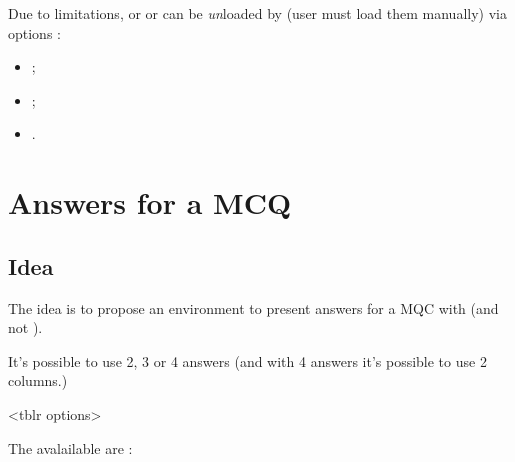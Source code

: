 \documentclass[english,11pt,a4paper]{article}
\begin{document}
Due to limitations,  or  or  can be \textit{un}loaded by  (user must load them manually) via options :

\begin{itemize}
	\item {} ;
	\item {} ;
	\item {}.
\end{itemize}

\begin{codehigh}[language=latex/latex3,style/main=teal!25,style/code=teal!25]
\usepackage{customenvs}

\usepackage[option(s)]{customenvs}
\end{codehigh}

\newpage

\section{Answers for a MCQ}

\subsection{Idea}

The idea is to propose an environment to present answers for a MQC with  (and not ).

\smallskip

It's possible to use 2, 3 or 4 answers (and with 4 answers it's possible to use 2 columns.)

\begin{codehigh}[language=latex/latex3,style/main=teal!25,style/code=teal!25]
<tblr options>
\end{codehigh}

The avalailable  are :
\end{document}
